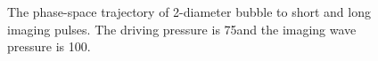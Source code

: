 \begin{figure}[t]
 \centering
%
%
  \caption{
The phase-space trajectory of \unit{2}\micro\metre-diameter bubble to short and long imaging pulses.
The driving pressure is  \unit{75}\kilo\pascal and the imaging wave pressure is  \unit{100}\kilo\pascal.
   }
 \label{fig:Phase_Pert}
\end{figure}


% 
%
%
%


